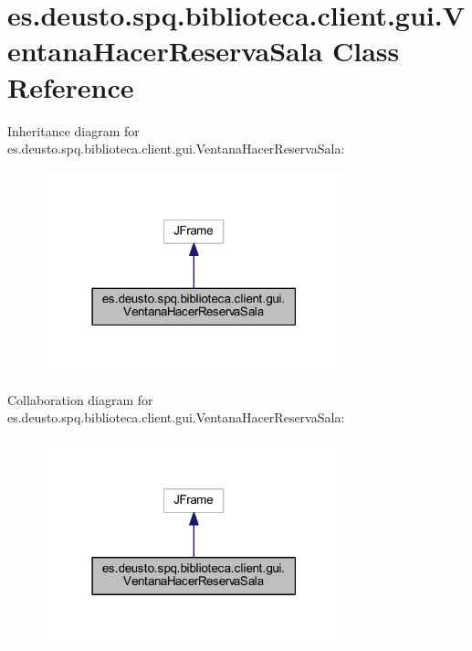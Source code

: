 \hypertarget{classes_1_1deusto_1_1spq_1_1biblioteca_1_1client_1_1gui_1_1_ventana_hacer_reserva_sala}{}\section{es.\+deusto.\+spq.\+biblioteca.\+client.\+gui.\+Ventana\+Hacer\+Reserva\+Sala Class Reference}
\label{classes_1_1deusto_1_1spq_1_1biblioteca_1_1client_1_1gui_1_1_ventana_hacer_reserva_sala}


Inheritance diagram for es.\+deusto.\+spq.\+biblioteca.\+client.\+gui.\+Ventana\+Hacer\+Reserva\+Sala\+:
\nopagebreak
\begin{figure}[H]
\begin{center}
\leavevmode
\includegraphics[width=247pt]{classes_1_1deusto_1_1spq_1_1biblioteca_1_1client_1_1gui_1_1_ventana_hacer_reserva_sala__inherit__graph}
\end{center}
\end{figure}


Collaboration diagram for es.\+deusto.\+spq.\+biblioteca.\+client.\+gui.\+Ventana\+Hacer\+Reserva\+Sala\+:
\nopagebreak
\begin{figure}[H]
\begin{center}
\leavevmode
\includegraphics[width=247pt]{classes_1_1deusto_1_1spq_1_1biblioteca_1_1client_1_1gui_1_1_ventana_hacer_reserva_sala__coll__graph}
\end{center}
\end{figure}
